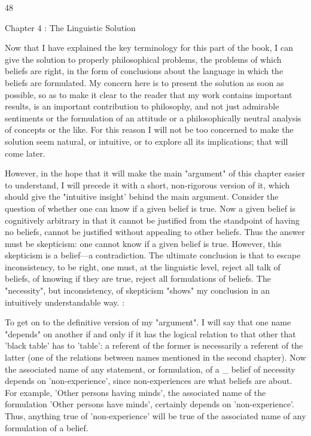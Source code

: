 \documentclass[10pt,twoside]{memoir}
\begin{document}
\begin{enumerate}
{{{{{{{{{{{{48 


Chapter 4 : The Linguistic Solution 


Now that I have explained the key terminology for this part of the 
book, I can give the solution to properly philosophical problems, the 
problems of which beliefs are right, in the form of conclusions about the 
language in which the beliefs are formulated. My concern here is to present 
the solution as soon as possible, so as to make it clear to the reader that my 
work contains important results, is an important contribution to philosophy, 
and not just admirable sentiments or the formulation of an attitude or a 
philosophically neutral analysis of concepts or the like. For this reason I will 
not be too concerned to make the solution seem natural, or intuitive, or to 
explore all its implications; that will come later. 

However, in the hope that it will make the main "argument" of this 
chapter easier to understand, I will precede it with a short, non-rigorous 
version of it, which should give the "intuitive insight' behind the main 
argument. Consider the question of whether one can know if a given belief is 
true. Now a given belief is cognitively arbitrary in that it cannot be justified 
from the standpoint of having no beliefs, cannot be justified without 
appealing to other beliefs. Thus the answer must be skepticism: one cannot 
know if a given belief is true. However, this skepticism is a belief---a 
contradiction. The ultimate conclusion is that to escape inconsistency, to be 
right, one must, at the linguistic level, reject all talk of beliefs, of knowing if 
they are true, reject all formulations of beliefs. The "necessity", but 
inconsistency, of skepticism "shows" my conclusion in an intuitively 
understandable way. : 

To get on to the definitive version of my "argument". I will say that 
one name "depends" on another if and only if it has the logical relation to 
that other that 'black table' has to 'table': a referent of the former is 
necessarily a referent of the latter (one of the relations between names 
mentioned in the second chapter). Now the associated name of any 
statement, or formulation, of a _ belief of necessity depends on 
'non-experience', since non-experiences are what beliefs are about. For 
example, 'Other persons having minds', the associated name of the 
formulation 'Other persons have minds', certainly depends on 
'non-experience'. Thus, anything true of 'non-experience' will be true of the 
associated name of any formulation of a belief. 

}}}}}}}}}}}}
\end{enumerate}
\end{document}
